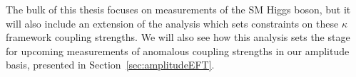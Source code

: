 


The bulk of this thesis focuses on measurements of the SM Higgs boson, but it will also include an extension of the analysis which sets constraints on these $\kappa$ framework coupling strengths. We will also see how this analysis sets the stage for upcoming measurements of anomalous coupling strengths in our amplitude basis, presented in Section~\ref{sec:amplitudeEFT}.
